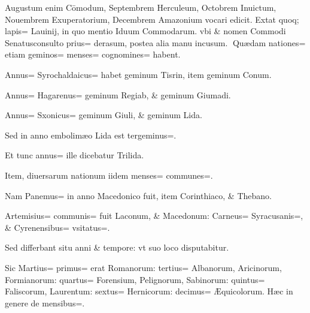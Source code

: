 \begin{parnumbers}

Augustum enim Cōmodum, Septembrem Herculeum, Octobrem Inuictum, Nouembrem Exuperatorium, Decembrem Amazonium vocari edicit. Extat quoq; lapis= Lauinij, in quo mentio Iduum Commodarum. vbi \& nomen Commodi Senatusconsulto prius= derasum, postea alia manu  incusum.
Quædam nationes= etiam geminos= menses= cognomines= habent.

Annus= Syrochaldaicus= habet geminum Tisrin, item geminum Conum.

Annus= Hagarenus= geminum Regiab, \& geminum Giumadi.

Annus= Sxonicus= geminum Giuli, \& geminum Lida.

Sed in anno embolimæo Lida est tergeminus=.

Et tunc annus= ille dicebatur Trilida.

Item, diuersarum nationum iidem menses= communes=.

Nam Panemus= in anno Macedonico fuit, item Corinthiaco, \& Thebano.

Artemisius= communis= fuit Laconum, \& Macedonum: Carneus= Syracusanis=, \& Cyrenensibus= vsitatus=.

Sed differbant situ anni \& tempore: vt suo loco disputabitur.

Sic Martius= primus= erat  Romanorum: tertius= Albanorum, Aricinorum, Formianorum: quartus= Forensium, Pelignorum, Sabinorum: quintus= Faliscorum, Laurentum: sextus= Hernicorum: decimus= Æquicolorum. Hæc in genere de mensibus=.

\end{parnumbers}

